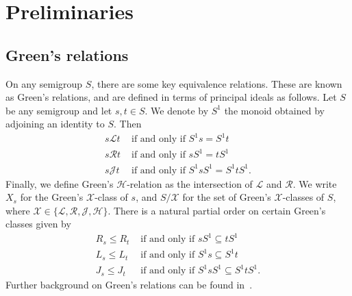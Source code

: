 \documentclass[11pt]{article}
\numberwithin{equation}{section}
\renewcommand{\L}{\mathscr{L}}
\newcommand{\R}{\mathscr{R}}
\newcommand{\J}{\mathscr{J}}
\renewcommand{\H}{\mathscr{H}}
\begin{document}
\section{Preliminaries}
\label{sec:Preliminaries}

\subsection{Green's relations}
On any semigroup $S$, there are some key equivalence relations. These are known
as Green's relations, and are defined in terms of principal ideals as follows.
Let $S$ be any semigroup and let $s, t \in S$. We denote by $S^1$ the monoid
obtained by adjoining an identity to $S$. Then
\begin{align*}
  s \L t &\text{ if and only if } S^1 s = S^1 t \\
  s \R t &\text{ if and only if } s S^1 = t S^1 \\
  s \J t &\text{ if and only if } S^1 s S^1 = S^1 t S^1.
\end{align*}
Finally, we define Green's $\H$-relation as the intersection of $\L$ and $\R$.
We write $X_s$ for the Green's $\mathcal{X}$-class of $s$, and $S/\mathcal{X}$
for the set of Green's $\mathcal{X}$-classes of $S$, where $\mathcal{X} \in
\{\L, \R, \J, \H\}$.
There is a natural partial order on certain Green's classes given by
\begin{align*}
  R_s \leq R_t &\text{ if and only if } sS^1 \subseteq tS^1 \\
  L_s \leq L_t &\text{ if and only if } S^1s \subseteq S^1t \\
  J_s \leq J_t &\text{ if and only if } S^1 s S^1 \subseteq S^1 t S^1.
\end{align*}
Further background on Green's relations can be found in~\cite{Howie1995aa}.
\end{document}
